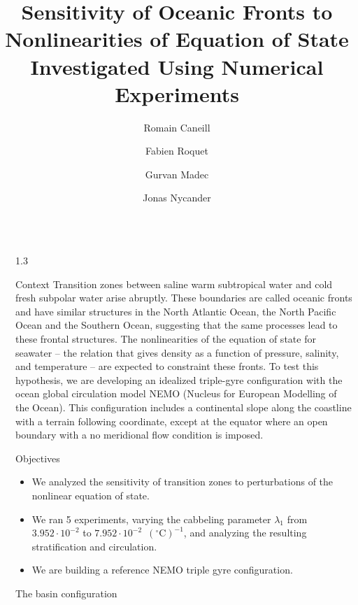\documentclass[final]{beamer}
\title{Sensitivity of Oceanic Fronts to Nonlinearities of Equation of
State Investigated Using Numerical Experiments}
\author{Romain Caneill \inst{1} \and Fabien Roquet \inst{1}
  \and Gurvan Madec \inst{2} \and Jonas Nycander \inst{3}}
\institute[shortinst]{\inst{1} University of Gothenburg, Sweden
  \samelineand \inst{2} LOCEAN-IPSL Sorbonne university, France
  \samelineand \inst{3} Stockholm University, Sweden}
\newlength{\sepwidth}
\newlength{\colwidth}
\newcommand{\separatorcolumn}{\begin{column}{\sepwidth}\end{column}}
\begin{document}
\begin{frame}[t]
\begin{columns}[t]
\separatorcolumn

\begin{column}{1.3\colwidth}
  \vspace{1.65cm}
  \begin{block}{Context}
    Transition zones between saline warm subtropical water and
    cold fresh subpolar water arise
    abruptly. These boundaries are called oceanic fronts
    and have similar structures in the North
    Atlantic Ocean, the North Pacific Ocean and
    the Southern Ocean, suggesting that the same
    processes lead to these frontal structures.
    The nonlinearities of
    the equation of state for seawater -- the
    relation that gives density as a function of
    pressure, salinity, and temperature --
    are expected to constraint these fronts.
    To test this hypothesis, we are developing
    an idealized triple-gyre configuration with the
    ocean global circulation model NEMO (Nucleus for
    European Modelling of the Ocean). This
    configuration includes a continental slope
    along the coastline with a terrain following
    coordinate, except at the equator where an open
    boundary with a no meridional flow
    condition is imposed.
  \end{block}

  \begin{alertblock}{Objectives}
    \begin{itemize}
    \item We analyzed the sensitivity of transition zones to perturbations of the
      nonlinear equation of state.
    \item We ran 5 experiments, varying the cabbeling
      parameter $\lambda_1$ from $3.952 \cdot 10^{-2}$ to $7.952 \cdot 10^{-2}$
      \,$(^\circ\text{C})^{-1}$, and analyzing the resulting
      stratification and circulation.
    \item We are building a reference NEMO triple gyre configuration.
    \end{itemize}
  \end{alertblock}

  \begin{block}{The basin configuration}
\end{block}
\end{column}
\end{columns}
\end{frame}
\end{document}

